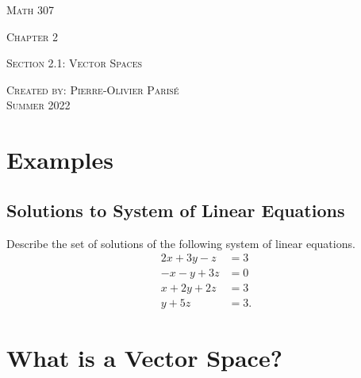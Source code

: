 \documentclass[12pt,a4paper]{article}
\newcounter{example}[section]
\begin{document}
\thispagestyle{empty}

\begin{center}
\vspace*{2.5cm}

{\Huge \textsc{Math 307}}

\vspace*{2cm}

{\LARGE \textsc{Chapter 2}} 

\vspace*{0.75cm}

\noindent\textsc{Section 2.1: Vector Spaces}

\vspace*{0.75cm}

\tableofcontents

\vfill

\noindent \textsc{Created by: Pierre-Olivier Paris{\'e}} \\
\textsc{Summer 2022}
\end{center}

\newpage

\section{Examples}

	\subsection{Solutions to System of Linear Equations}
	
	\begin{example}
	Describe the set of solutions of the following system of linear equations.
		\begin{align*}
		2x + 3y - z & = 3 \\
		-x - y + 3z & = 0 \\
		x + 2y + 2z & = 3 \\
		y + 5z & = 3 .
		\end{align*}
	\end{example}
	
\newpage

\section{What is a Vector Space?}
\end{document}
